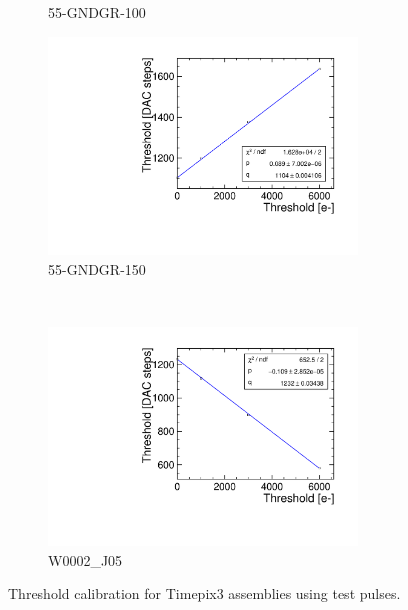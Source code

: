 \begin{figure}[htbp]
\begin{subfigure}[b]{0.45\textwidth}
    \caption{55-GNDGR-100}
  \end{subfigure} \hfill
  \begin{subfigure}[b]{0.45\textwidth}
    \includegraphics[width=0.9\textwidth]{./figures/Calibration/THLcalibration_W0005_F01.pdf}
    \caption{55-GNDGR-150}
  \end{subfigure}\\
  \begin{subfigure}[b]{0.45\textwidth}
    \includegraphics[width=0.9\textwidth]{./figures/Calibration/THLcalibration_W0002_J05.pdf}
    \caption{W0002\_J05}
  \end{subfigure}
  \caption{Threshold calibration for Timepix3 assemblies using test pulses.}
  \label{fig:Timepix3_THL_Calibration}
\end{figure}




